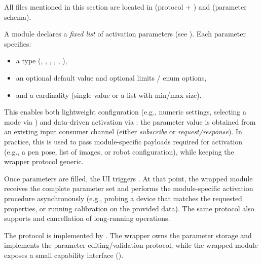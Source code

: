All files mentioned in this section are located in  (protocol + ) and  (parameter schema).

A module declares a \emph{fixed list} of activation parameters (see ). Each parameter specifies:
\begin{itemize}
    \item a type (, , , , , ),
    \item an optional default value and optional limits / enum options,
    \item and a cardinality (single value or a list with min/max size).
\end{itemize}
This enables both lightweight configuration (e.g., numeric settings, selecting a mode via ) and data-driven activation via : the parameter value is obtained from an existing input consumer channel (either \emph{subscribe} or \emph{request/response}). In practice, this is used to pass module-specific payloads required for activation (e.g., a pen pose, list of images, or robot configuration), while keeping the wrapper protocol generic.

Once parameters are filled, the UI triggers . At that point, the wrapped module receives the complete parameter set and performs the module-specific activation procedure asynchronously (e.g., probing a device that matches the requested properties, or running calibration on the provided data). The same protocol also supports  and cancellation of long-running operations.

The protocol is implemented by . The wrapper owns the parameter storage and implements the parameter editing/validation protocol, while the wrapped module exposes a small capability interface  ().

